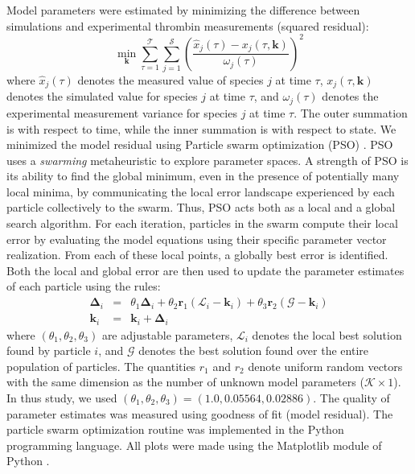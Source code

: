 \documentclass[processes,article,received,moreauthors,pdftex,12pt,a4paper]{mdpi}
\begin{document}
Model parameters were estimated by minimizing the difference between simulations and experimental thrombin measurements (squared residual):
\begin{equation}\label{eqn:objective-function}
	\min_{\mathbf{k}} \sum_{\tau=1}^{\mathcal{T}}\sum_{j=1}^{\mathcal{S}}\left(\frac{\hat{x}_{j}\left(\tau\right) - x_{j}\left(\tau,\mathbf{k}\right)}{\omega_{j}\left(\tau\right)}\right)^{2}
\end{equation}where $\hat{x}_{j}\left(\tau\right)$ denotes the measured value of species $j$ at time $\tau$, $x_{j}\left(\tau,\mathbf{k}\right)$ denotes the simulated 
value for species $j$ at time $\tau$, and $\omega_{j}\left(\tau\right)$ denotes the experimental measurement variance for species $j$ at time $\tau$. The outer summation is with respect to
time, while the inner summation is with respect to state. We minimized the model residual using Particle swarm optimization (PSO) \citep{PSO}.
PSO uses a \textit{swarming} metaheuristic to explore parameter spaces. 
A strength of PSO is its ability to find the global minimum, even in the presence of potentially many local minima, by communicating the local
error landscape experienced by each particle collectively to the swarm. Thus, PSO acts both as a local and a global search algorithm. 
For each iteration, particles in the swarm compute their local error by evaluating the model equations using their specific parameter vector realization.
From each of these local points, a globally best error is identified. Both the local and global error 
are then used to update the parameter estimates of each particle using the rules:
\begin{eqnarray}
	\mathbf{\Delta}_{i} &=&\theta_{1}\mathbf{\Delta}_{i} + \theta_{2}\mathbf{r}_{1}\left(\mathcal{L}_{i} - \mathbf{k}_{i}\right) + \theta_{3}\mathbf{r}_{2}\left(\mathcal{G} - \mathbf{k}_{i}\right) \\
	\mathbf{k}_{i} &=& \mathbf{k}_{i} + \mathbf{\Delta}_{i}
\end{eqnarray}where $\left(\theta_{1},\theta_{2},\theta_{3}\right)$ are adjustable parameters, $\mathcal{L}_{i}$ denotes the local best solution found by particle $i$, and
$\mathcal{G}$ denotes the best solution found over the entire population of particles. The quantities $r_{1}$ and $r_{2}$ denote uniform random vectors with the same dimension as the number of unknown model
parameters ($\mathcal{K}\times{1}$). In thus study, we used $\left(\theta_{1},\theta_{2},\theta_{3}\right) = \left(1.0, 0.05564, 0.02886\right)$. The quality of parameter
estimates was measured using goodness of fit (model residual). The particle swarm optimization routine was implemented in the Python programming language. 
All plots were made using the Matplotlib module of Python \citep{Matplotlib}.\newline
\end{document}
